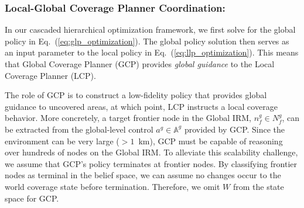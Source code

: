 \documentclass[letterpaper]{article} %
\newcommand{\phdone}[1]{} %
\begin{document}
\subsubsection{Local-Global Coverage Planner Coordination:} \hfill
\vspace{-0.25pt}

\noindent
In our cascaded hierarchical optimization framework, we first solve for the global policy in Eq.~(\ref{eq:glp_optimization}). The global policy solution then serves as an input parameter to the local policy in Eq.~(\ref{eq:llp_optimization}). This means that Global Coverage Planner (GCP) provides \textit{global guidance} to the Local Coverage Planner (LCP).





The role of GCP is to construct a low-fidelity policy that provides global guidance to uncovered areas, at which point, LCP instructs a local coverage behavior. More concretely, a target frontier node in the Global IRM, $n^g_f \in N^g_f$, can be extracted from the global-level control $a^g \in \mathbb{A}^g$ provided by GCP. Since the environment can be very large ($>\!\!1$~km), GCP must be capable of reasoning over hundreds of nodes on the Global IRM. To alleviate this scalability challenge, we assume that GCP's policy terminates at frontier nodes. By classifying frontier nodes as terminal in the belief space, we can assume no changes occur to the world coverage state before termination. Therefore, we omit $W$ from the state space for GCP.
% 
\end{document}
